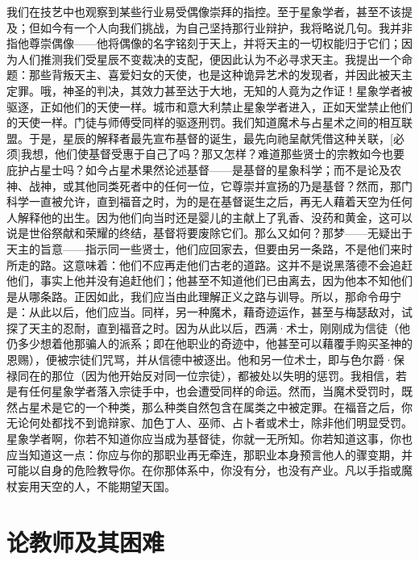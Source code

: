 我们在技艺中也观察到某些行业易受偶像崇拜的指控。至于星象学者，甚至不该提及；但如今有一个人向我们挑战，为自己坚持那行业辩护，我将略说几句。我并非指他尊崇偶像——他将偶像的名字铭刻于天上，并将天主的一切权能归于它们；因为人们推测我们受星辰不变裁决的支配，便因此认为不必寻求天主。我提出一个命题：那些背叛天主、喜爱妇女的天使，也是这种诡异艺术的发现者，并因此被天主定罪。哦，神圣的判决，其效力甚至达于大地，无知的人竟为之作证！星象学者被驱逐，正如他们的天使一样。城市和意大利禁止星象学者进入，正如天堂禁止他们的天使一样。门徒与师傅受同样的驱逐刑罚。我们知道魔术与占星术之间的相互联盟。于是，星辰的解释者最先宣布基督的诞生，最先向祂呈献凭借这种关联，[必须]我想，他们使基督受惠于自己了吗？那又怎样？难道那些贤士的宗教如今也要庇护占星士吗？如今占星术果然论述基督——是基督的星象科学；而不是论及农神、战神，或其他同类死者中的任何一位，它尊崇并宣扬的乃是基督？然而，那门科学一直被允许，直到福音之时，为的是在基督诞生之后，再无人藉着天空为任何人解释他的出生。因为他们向当时还是婴儿的主献上了乳香、没药和黄金，这可以说是世俗祭献和荣耀的终结，基督将要废除它们。那么又如何？那梦——无疑出于天主的旨意——指示同一些贤士，他们应回家去，但要由另一条路，不是他们来时所走的路。这意味着：他们不应再走他们古老的道路。这并不是说黑落德不会追赶他们，事实上他并没有追赶他们；他甚至不知道他们已由离去，因为他本不知他们是从哪条路。正因如此，我们应当由此理解正义之路与训导。所以，那命令毋宁是：从此以后，他们应当。同样，另一种魔术，藉奇迹运作，甚至与梅瑟敌对，试探了天主的忍耐，直到福音之时。因为从此以后，西满·术士，刚刚成为信徒（他仍多少想着他那骗人的派系；即在他职业的奇迹中，他甚至可以藉覆手购买圣神的恩赐），便被宗徒们咒骂，并从信德中被逐出。他和另一位术士，即与色尔爵·保禄同在的那位（因为他开始反对同一位宗徒），都被处以失明的惩罚。我相信，若是有任何星象学者落入宗徒手中，也会遭受同样的命运。然而，当魔术受罚时，既然占星术是它的一个种类，那么种类自然包含在属类之中被定罪。在福音之后，你无论何处都找不到诡辩家、加色丁人、巫师、占卜者或术士，除非他们明显受罚。星象学者啊，你若不知道你应当成为基督徒，你就一无所知。你若知道这事，你也应当知道这一点：你应与你的那职业再无牵连，那职业本身预言他人的骤变期，并可能以自身的危险教导你。在你那体系中，你没有分，也没有产业。凡以手指或魔杖妄用天空的人，不能期望天国。\par


\section{论教师及其困难}

